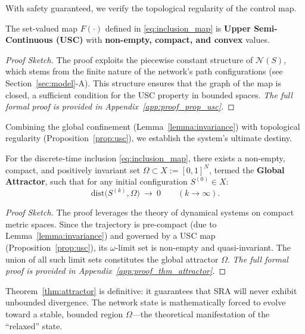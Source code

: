 \documentclass{ccjnl}
\begin{document}
With safety guaranteed, we verify the topological regularity of the control map.

\begin{proposition}
\label{prop:usc}
The set-valued map $F(\cdot)$ defined in \eqref{eq:inclusion_map} is \textbf{Upper Semi-Continuous (USC)} with \textbf{non-empty, compact, and convex} values.
\end{proposition}
\begin{proof}[Proof Sketch]
The proof exploits the piecewise constant structure of $\mathcal{N}(S)$, which stems from the finite nature of the network's path configurations (see Section~\ref{sec:model}-A). This structure ensures that the graph of the map is closed, a sufficient condition for the USC property in bounded spaces. \textit{The full formal proof is provided in Appendix~\ref{app:proof_prop_usc}.}
\end{proof}

Combining the global confinement (Lemma~\ref{lemma:invariance}) with topological regularity (Proposition~\ref{prop:usc}), we establish the system's ultimate destiny.

\begin{theorem}
\label{thm:attractor}
For the discrete-time inclusion \eqref{eq:inclusion_map}, there exists a non-empty, compact, and positively invariant set $\Omega\subset X:=[0,1]^N$, termed the \textbf{Global Attractor}, such that for any initial configuration $S^{(0)}\in X$:
\begin{equation}\label{eq:attractor_convergence}
\mathrm{dist}\big(S^{(k)},\Omega\big)\ \to\ 0\qquad (k\to\infty).
\end{equation}
\end{theorem}
\begin{proof}[Proof Sketch]
The proof leverages the theory of dynamical systems on compact metric spaces. Since the trajectory is pre-compact (due to Lemma~\ref{lemma:invariance}) and governed by a USC map (Proposition~\ref{prop:usc}), its $\omega$-limit set is non-empty and quasi-invariant. The union of all such limit sets constitutes the global attractor $\Omega$. \textit{The full formal proof is provided in Appendix~\ref{app:proof_thm_attractor}.}
\end{proof}

Theorem~\ref{thm:attractor} is definitive: it guarantees that SRA will never exhibit unbounded divergence. The network state is mathematically forced to evolve toward a stable, bounded region $\Omega$---the theoretical manifestation of the ``relaxed'' state.
\end{document}
